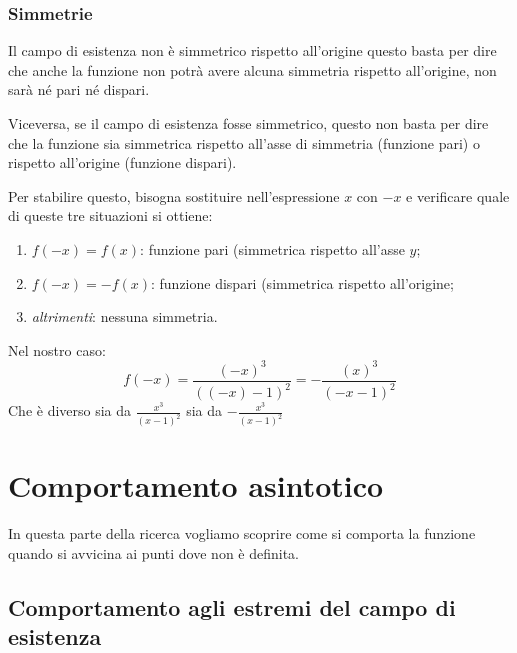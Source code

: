 \subsubsection{Simmetrie}

Il campo di esistenza non è simmetrico rispetto all'origine questo basta per
dire che anche la funzione non potrà avere alcuna simmetria rispetto 
all'origine, non sarà né pari né dispari.

Viceversa, se il campo di esistenza fosse simmetrico, questo non basta per 
dire che la funzione sia simmetrica rispetto all'asse di simmetria 
(funzione pari) o rispetto all'origine (funzione dispari).

Per stabilire questo, bisogna sostituire nell'espressione \(x\) con \(-x\) e 
verificare quale di queste tre situazioni si ottiene:

\begin{enumerate} [nosep]
 \item \(f(-x)=f(x)\): funzione pari (simmetrica rispetto all'asse \(y\);
 \item \(f(-x)=-f(x)\): funzione dispari (simmetrica rispetto all'origine;
 \item \emph{altrimenti}: nessuna simmetria.
\end{enumerate}

Nel nostro caso: 
\[f(-x)=\frac{(-x)^3}{((-x)-1)^2} = -\frac{(x)^3}{(-x-1)^2}\]
Che è diverso sia da 
\(\frac{x^3}{(x-1)^2}\)
sia da
\(-\frac{x^3}{(x-1)^2}\)


\section{Comportamento asintotico}
\label{sec:comportamentoasintotico}

In questa parte della ricerca vogliamo scoprire come si comporta la funzione 
quando si avvicina ai punti dove non è definita.

\subsection{Comportamento agli estremi del campo di esistenza}

\mbox{ }

